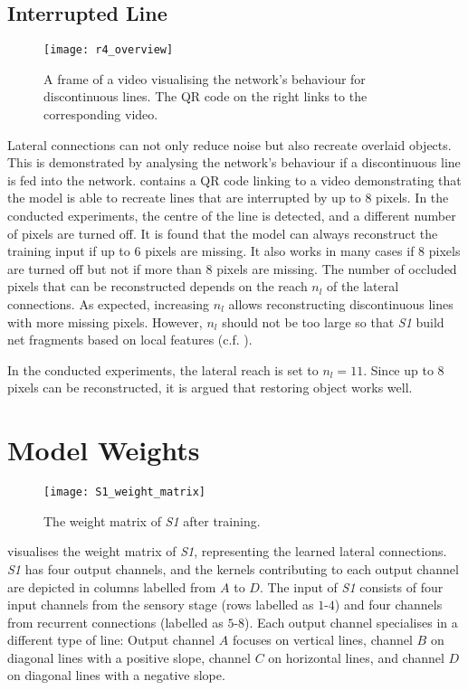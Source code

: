 \subsection{Interrupted Line}
%
\begin{figure}[h]
    \centering
    \texttt{[image: r4\_overview]}
    \caption[Video visualising the network's behaviour for discontinuous lines]{A frame of a video visualising the network's behaviour for discontinuous lines. The QR code on the right links to the corresponding video.}
\end{figure}
%
Lateral connections can not only reduce noise but also recreate overlaid objects.
This is demonstrated by analysing the network's behaviour if a discontinuous line is fed into the network.
 contains a QR code linking to a video demonstrating that the model is able to recreate lines that are interrupted by up to $8$ pixels.
In the conducted experiments, the centre of the line is detected, and a different number of pixels are turned off.
It is found that the model can always reconstruct the training input if up to $6$ pixels are missing.
It also works in many cases if $8$ pixels are turned off but not if more than $8$ pixels are missing.
The number of occluded pixels that can be reconstructed depends on the reach $n_l$ of the lateral connections.
As expected, increasing $n_l$ allows reconstructing discontinuous lines with more missing pixels.
However, $n_l$ should not be too large so that \emph{S1} build net fragments based on local features (c.f. ).

In the conducted experiments, the lateral reach is set to $n_l=11$.
Since up to $8$ pixels can be reconstructed, it is argued that restoring object works well.


\section{Model Weights}
%
\begin{figure}[h]
    \centering
    \texttt{[image: S1\_weight\_matrix]}
    \caption[Weight matrix of \emph{S1} after training]{The weight matrix of \emph{S1} after training.}
\end{figure}
%
 visualises the weight matrix of \emph{S1}, representing the learned lateral connections.
\emph{S1} has four output channels, and the kernels contributing to each output channel are depicted in columns labelled from $A$ to $D$.
The input of \emph{S1} consists of four input channels from the sensory stage (rows labelled as $1$-$4$) and four channels from recurrent connections (labelled as $5$-$8$).
Each output channel specialises in a different type of line: Output channel $A$ focuses on vertical lines, channel $B$ on diagonal lines with a positive slope, channel $C$ on horizontal lines, and channel $D$ on diagonal lines with a negative slope.

